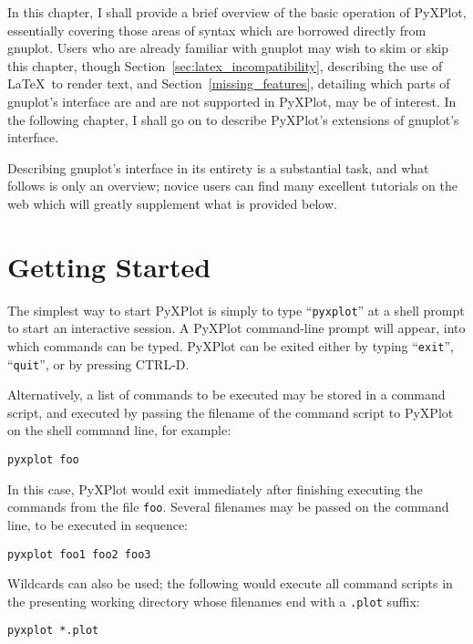 \documentclass[a4paper,onecolumn,11pt]{book}
\begin{document}
In this chapter, I shall provide a brief overview of the basic operation of
PyXPlot, essentially covering those areas of syntax which are borrowed directly
from gnuplot. Users who are already familiar with gnuplot may wish to skim or
skip this chapter, though Section~\ref{sec:latex_incompatibility}, describing
the use of \LaTeX\ to render text, and Section~\ref{missing_features},
detailing which parts of gnuplot's interface are and are not supported in
PyXPlot, may be of interest. In the following chapter, I shall go on to
describe PyXPlot's extensions of gnuplot's interface.

Describing gnuplot's interface in its entirety is a substantial task, and what
follows is only an overview; novice users can find many excellent tutorials on
the web which will greatly supplement what is provided below.

\section{Getting Started}

The simplest way to start PyXPlot is simply to type ``\texttt{pyxplot}'' at a
shell prompt to start an interactive session. A PyXPlot command-line prompt will
appear, into which commands can be typed. PyXPlot can be exited either by
typing ``\texttt{exit}'', ``\texttt{quit}'', or by pressing CTRL-D.

Alternatively, a list of commands to be executed may be stored in a command
script, and executed by passing the filename of the command script to PyXPlot
on the shell command line, for example:

\begin{verbatim}
pyxplot foo
\end{verbatim}

\noindent In this case, PyXPlot would exit immediately after finishing
executing the commands from the file \texttt{foo}. Several filenames may be
passed on the command line, to be executed in sequence:

\begin{verbatim}
pyxplot foo1 foo2 foo3
\end{verbatim}

\noindent Wildcards can also be used; the following would execute all command
scripts in the presenting working directory whose filenames end with a
\texttt{.plot} suffix:

\begin{verbatim}
pyxplot *.plot
\end{verbatim}
\end{document}
